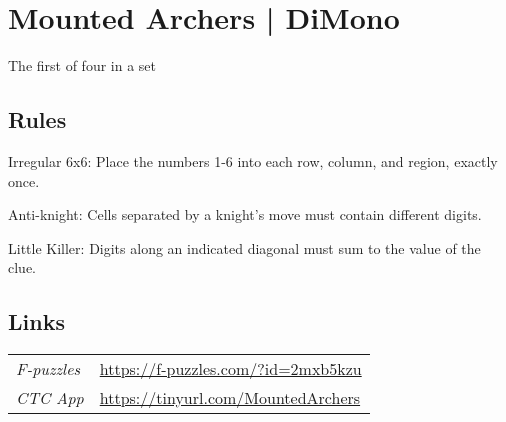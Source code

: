 \section{Mounted Archers | {\normalfont DiMono}}
\label{sec:20-mounted-archers-dimono}
The first of four in a set
\subsection*{Rules}
\begin{markdown}
Irregular 6x6: Place the numbers 1-6 into each row, column, and region, exactly once.



Anti-knight: Cells separated by a knight's move must contain different digits.



Little Killer: Digits along an indicated diagonal must sum to the value of the clue.
\end{markdown}
\subsection*{Links}
\begin{tabularx}{\textwidth}{l X}
\emph{F-puzzles} & \url{https://f-puzzles.com/?id=2mxb5kzu} \\
\emph{CTC App} & \url{https://tinyurl.com/MountedArchers} \\
\end{tabularx}
\pagebreak
